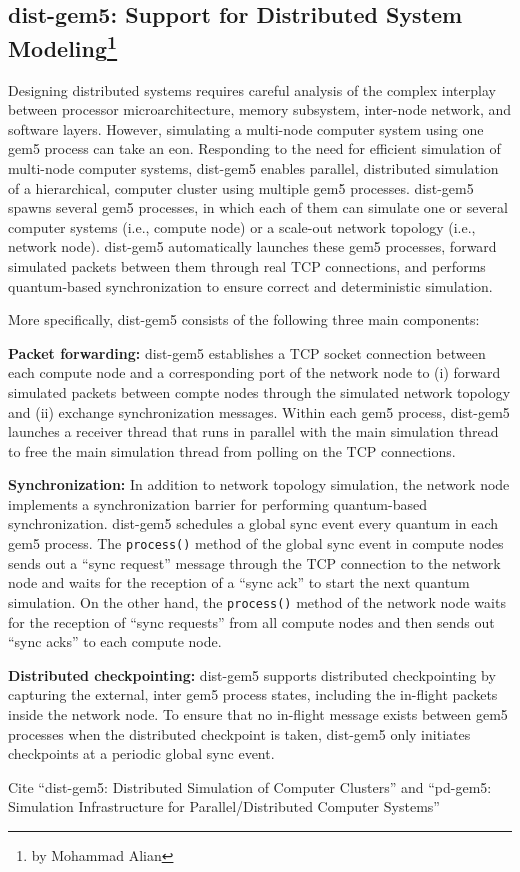 \subsection[dist-gem5: Support for Distributed System Modeling]{dist-gem5: Support for Distributed System Modeling\footnote{by Mohammad Alian}}

Designing distributed systems requires careful analysis of the complex interplay between processor
microarchitecture, memory subsystem, inter-node network, and software layers.
However, simulating a multi-node computer system using one gem5 process can take an eon.
Responding to the need for efficient simulation of multi-node computer systems, dist-gem5 enables parallel, distributed simulation of a hierarchical, computer cluster using multiple gem5 processes.
dist-gem5 spawns several gem5 processes, in which each of them can simulate one or several computer systems (i.e., compute node) or a scale-out network topology (i.e., network node).
dist-gem5 automatically launches these gem5 processes, forward simulated packets between them through real TCP connections, and performs quantum-based synchronization to ensure correct and deterministic simulation.

More specifically, dist-gem5 consists of the following three main components:

\textbf{Packet forwarding:} dist-gem5 establishes a TCP socket connection between each compute node and a corresponding port of the network node to (i) forward simulated packets between compte nodes
through the simulated network topology and (ii) exchange synchronization messages.
Within each gem5 process, dist-gem5 launches a receiver thread that runs in parallel with the main simulation thread to free the main simulation thread from polling on the TCP connections.

\textbf{Synchronization:} In addition to network topology simulation, the network node implements a
synchronization barrier for performing quantum-based synchronization.
dist-gem5 schedules a global
sync event every quantum in each gem5 process.
The \verb|process()| method of the global sync event in
compute nodes sends out a ``sync request'' message through the TCP connection to the network node
and waits for the reception of a ``sync ack'' to start the next quantum simulation.
On the other hand, the \verb|process()| method of the network node waits for the reception of ``sync requests'' from all compute nodes and then sends out ``sync acks'' to each compute node.

\textbf{Distributed checkpointing:} dist-gem5 supports distributed checkpointing by capturing the external, inter gem5 process states, including the in-flight packets inside the network node.
To ensure that no in-flight message exists between gem5 processes when the distributed checkpoint is taken, dist-gem5 only initiates checkpoints at a periodic global sync event.

Cite ``dist-gem5: Distributed Simulation of Computer Clusters'' and ``pd-gem5: Simulation Infrastructure for Parallel/Distributed Computer Systems''
